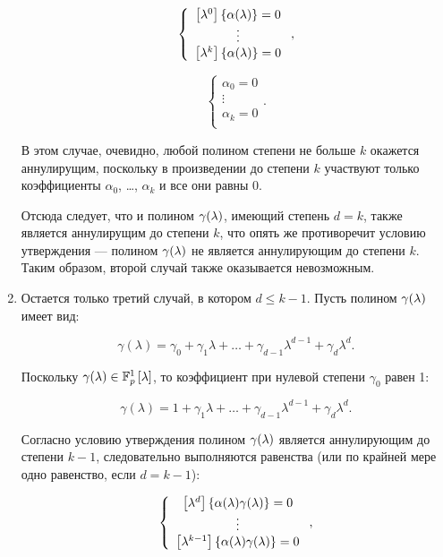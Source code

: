 \begin{statement}
\begin{enumerate}
				$$
					\left \{
					\begin{array}{c}
						\left [ \lambda^{0} \right ] \left \{ \alpha (\lambda) \right \} = 0 \\
						\vdots \\
						\left [ \lambda^{k} \right ] \left \{ \alpha (\lambda) \right \} = 0 \\
					\end{array}
					\right .
					,
				$$

				$$
					\left \{
					\begin{array}{c}
						\alpha_0 = 0 \\
						\vdots \\
						\alpha_k = 0 \\
					\end{array}
					\right .
					.
				$$

			В этом случае, очевидно, любой полином степени не больше $k$ окажется аннулирущим, поскольку в произведении до степени $k$
			участвуют только коэффициенты $\alpha_0$, \dots, $\alpha_k$ и все они равны 0.

			Отсюда следует, что и полином $\gamma (\lambda)$, имеющий степень $d = k$, также является аннулирущим до степени $k$, что
			опять же противоречит условию утверждения --- полином $\gamma (\lambda)$ не является аннулирующим до степени $k$. Таким образом,
			второй случай также оказывается невозможным.

		\item
			Остается только третий случай, в котором $d \le k-1$. Пусть полином $\gamma (\lambda)$ имеет вид:

				$$ \gamma(\lambda) = \gamma_0 + \gamma_1 \lambda + \dots + \gamma_{d-1} \lambda^{d-1} + \gamma_d \lambda^d. $$

			Поскольку $\gamma (\lambda) \in \mathbb{F}_p^1 \left [ \lambda \right ]$, то коэффициент при нулевой степени $\gamma_0$ равен 1:

				$$ \gamma(\lambda) = 1 + \gamma_1 \lambda + \dots + \gamma_{d-1} \lambda^{d-1} + \gamma_{d} \lambda^d. $$

			Согласно условию утверждения полином $\gamma (\lambda)$ является аннулирующим до степени $k-1$, следовательно выполняются
			равенства (или по крайней мере одно равенство, если $d = k-1$):

				$$
					\left \{
					\begin{array}{c}
						\left [ \lambda^{d} \right ] \left \{ \alpha (\lambda) \gamma (\lambda) \right \} = 0 \\
						\vdots \\
						\left [ \lambda^{k-1} \right ] \left \{ \alpha (\lambda) \gamma (\lambda) \right \} = 0 \\
					\end{array}
					\right .
					,
				$$


\end{enumerate}
\end{statement}
